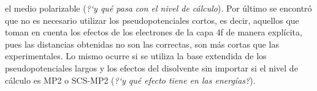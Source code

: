 el medio polarizable ({\it ?`y qu\'e pasa con el nivel de 
c\'alculo}). Por \'ultimo se encontr\'o que no es necesario utilizar 
los pseudopotenciales cortos, es decir, aquellos que toman
en cuenta los efectos de los electrones de la capa 4f de manera 
expl\'icita, pues las distancias obtenidas no son las correctas, son
m\'as cortas que las experimentales. Lo mismo ocurre si se utiliza la
base extendida de los pseudopotenciales largos y los efectos del 
disolvente sin importar si el nivel de c\'alculo es MP2 o SCS-MP2 
({\it ?`y qu\'e efecto tiene en las energ\'ias?}). 

